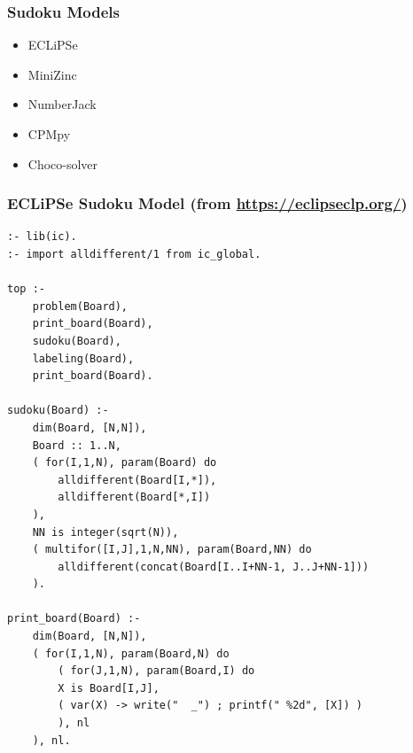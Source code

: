
\begin{frame}
\frametitle{Sudoku Models}
\begin{itemize}
\item ECLiPSe \hyperlink{sudoku:eclipse}{}
\item MiniZinc \hyperlink{sudoku:minizinc}{}
\item NumberJack \hyperlink{sudoku:numberjack}{}
\item CPMpy \hyperlink{sudoku:cpmpy}{}
\item Choco-solver \hyperlink{sudoku:choco}{}
\end{itemize}
\end{frame}

\begin{frame}[fragile]
\frametitle{ECLiPSe Sudoku Model {\small(from \url{https://eclipseclp.org/})}}
\label{sudoku:eclipse}
\tiny
\begin{verbatim}
:- lib(ic).
:- import alldifferent/1 from ic_global.

top :-
    problem(Board),
    print_board(Board),
    sudoku(Board),
    labeling(Board),
    print_board(Board).

sudoku(Board) :-
    dim(Board, [N,N]),
    Board :: 1..N,
    ( for(I,1,N), param(Board) do
        alldifferent(Board[I,*]),
        alldifferent(Board[*,I])
    ),
    NN is integer(sqrt(N)),
    ( multifor([I,J],1,N,NN), param(Board,NN) do
        alldifferent(concat(Board[I..I+NN-1, J..J+NN-1]))
    ).

print_board(Board) :-
    dim(Board, [N,N]),
    ( for(I,1,N), param(Board,N) do
        ( for(J,1,N), param(Board,I) do
        X is Board[I,J],
        ( var(X) -> write("  _") ; printf(" %2d", [X]) )
        ), nl
    ), nl.
\end{verbatim}
\end{frame}

